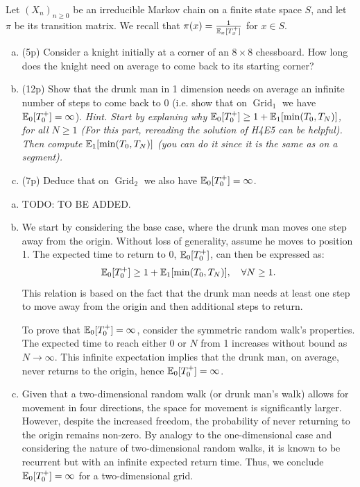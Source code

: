 \begin{problem}
	Let $(X_n)_{n\geq 0}$ be an irreducible Markov chain on a finite state space $S$, and let $\pi$ be its transition matrix. We recall that $\pi(x) = \frac{1}{\mathbb{E}_x[T_x^+]}$ for $x\in S$.
	\begin{enumerate}[(a)]
		\item (5p) Consider a knight initially at a corner of an $8\times 8$ chessboard. How long does the knight need on average to come back to its starting corner?
		\item (12p) Show that the drunk man in 1 dimension needs on average an infinite number of steps to come back to 0 (i.e. show that on $\operatorname{Grid}_1$ we have $\mathbb{E}_0[T_0^+] = \infty$). \textit{Hint. Start by explaning why $\mathbb{E}_0[T_0^+] \geq 1 + \mathbb{E}_1[\min(T_0,T_N)]$, for all $N\geq 1$ (For this part, rereading the solution of H4E5 can be helpful). Then compute $\mathbb{E}_1[ \min(T_0,T_N)]$ (you can do it since it is the same as on a segment).}
		\item (7p) Deduce that on $\operatorname{Grid}_2$ we also have $\mathbb{E}_0[T_0^+] = \infty$.
	\end{enumerate}
\end{problem}

\begin{solution}
	\begin{enumerate}[(a)]
		\item {\color{red} \noindent TODO: TO BE ADDED.}
		\item 
		We start by considering the base case, where the drunk man moves one step away from the origin. Without loss of generality, assume he moves to position 1. The expected time to return to 0, $\mathbb{E}_0[T_0^+]$, can then be expressed as:
		\[
		\mathbb{E}_0[T_0^+] \geq 1 + \mathbb{E}_1[\min(T_0,T_N)], \quad \forall N \geq 1.
		\]
		This relation is based on the fact that the drunk man needs at least one step to move away from the origin and then additional steps to return.
		
		To prove that $\mathbb{E}_0[T_0^+] = \infty$, consider the symmetric random walk's properties. The expected time to reach either 0 or $N$ from 1 increases without bound as $N \to \infty$. This infinite expectation implies that the drunk man, on average, never returns to the origin, hence $\mathbb{E}_0[T_0^+] = \infty$.
		\item 
		Given that a two-dimensional random walk (or drunk man's walk) allows for movement in four directions, the space for movement is significantly larger. However, despite the increased freedom, the probability of never returning to the origin remains non-zero. By analogy to the one-dimensional case and considering the nature of two-dimensional random walks, it is known to be recurrent but with an infinite expected return time. Thus, we conclude $\mathbb{E}_0[T_0^+] = \infty$ for a two-dimensional grid.
	\end{enumerate}
	
\end{solution}



